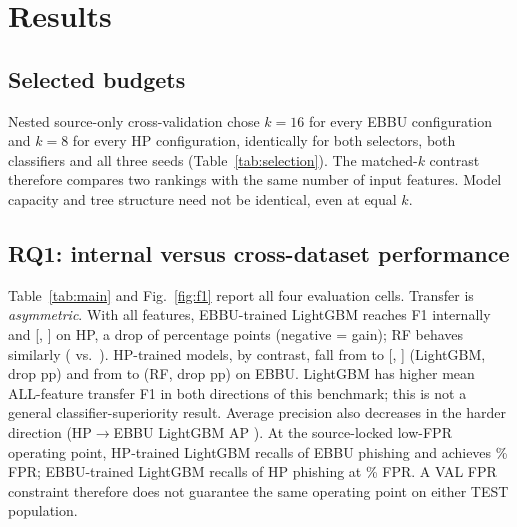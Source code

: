 \section{Results}
\subsection{Selected budgets}
Nested source-only cross-validation chose $k{=}16$ for every EBBU configuration and $k{=}8$ for every HP configuration, identically for both selectors, both classifiers and all three seeds (Table~\ref{tab:selection}). The matched-$k$ contrast therefore compares two rankings with the same number of input features. Model capacity and tree structure need not be identical, even at equal $k$.

\begin{table}[t]
\caption{Selected budgets ($k$ for seeds 17/29/43) and the STABLE-PI subset of seed 17.}
\label{tab:selection}
\centering\scriptsize
\setlength{\tabcolsep}{4pt}

\end{table}

\subsection{RQ1: internal versus cross-dataset performance}
Table~\ref{tab:main} and Fig.~\ref{fig:f1} report all four evaluation cells. Transfer is \emph{asymmetric}. With all features, EBBU-trained LightGBM reaches F1  internally and  [, ] on HP, a drop of  percentage points (negative = gain); RF behaves similarly ( vs.\ ). HP-trained models, by contrast, fall from  to  [, ] (LightGBM, drop  pp) and from  to  (RF, drop  pp) on EBBU. LightGBM has higher mean ALL-feature transfer F1 in both directions of this benchmark; this is not a general classifier-superiority result. Average precision also decreases in the harder direction (HP$\rightarrow$EBBU LightGBM AP ). At the source-locked low-FPR operating point, HP-trained LightGBM recalls  of EBBU phishing and achieves \% FPR; EBBU-trained LightGBM recalls  of HP phishing at \% FPR. A VAL FPR constraint therefore does not guarantee the same operating point on either TEST population.

